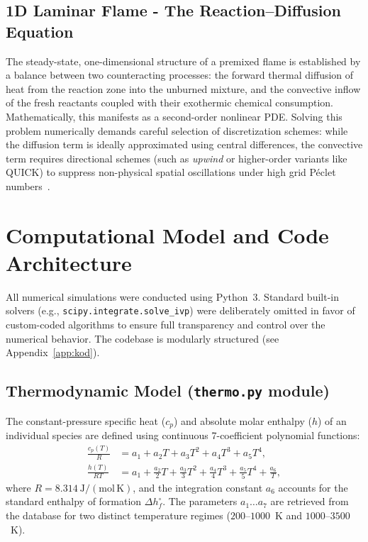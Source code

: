 \documentclass[11pt,a4paper]{article}
\begin{document}
\subsection{1D Laminar Flame - The Reaction--Diffusion Equation}
\label{sec:lit-flame}
The steady-state, one-dimensional structure of a premixed flame is established by a balance between
two counteracting processes: the forward thermal diffusion of heat from the reaction zone into the
unburned mixture, and the convective inflow of the fresh reactants coupled with their exothermic
chemical consumption. Mathematically, this manifests as a second-order nonlinear PDE. Solving this problem
numerically demands careful selection of discretization schemes: while the diffusion term is ideally
approximated using central differences, the convective term requires directional schemes (such as
\emph{upwind} or higher-order variants like QUICK) to suppress non-physical spatial oscillations
under high grid Péclet numbers~\cite{press, williams}.


\section{Computational Model and Code Architecture}

All numerical simulations were conducted using Python~3. Standard built-in solvers (e.g.,
\texttt{scipy.integrate.solve\_ivp}) were deliberately omitted in favor of custom-coded algorithms
to ensure full transparency and control over the numerical behavior. The codebase is modularly structured
(see Appendix~\ref{app:kod}).

\subsection{Thermodynamic Model (\texttt{thermo.py} module)}
The constant-pressure specific heat ($c_p$) and absolute molar enthalpy ($h$) of an individual species
are defined using continuous 7-coefficient polynomial functions:
\begin{align}
  \frac{c_p(T)}{R} &= a_1 + a_2 T + a_3 T^2 + a_4 T^3 + a_5 T^4,
  \label{eq:cp}\\
  \frac{h(T)}{R T} &= a_1 + \tfrac{a_2}{2} T + \tfrac{a_3}{3} T^2
                      + \tfrac{a_4}{4} T^3 + \tfrac{a_5}{5} T^4 + \frac{a_6}{T},
  \label{eq:h}
\end{align}
where $R=8.314\ \mathrm{J/(mol\,K)}$, and the integration constant $a_6$ accounts for the standard enthalpy
of formation $\Delta h_f^\circ$. The parameters $a_1\dots a_7$ are retrieved from the database for two
distinct temperature regimes ($200$--$1000$~K and $1000$--$3500$~K).
\end{document}
